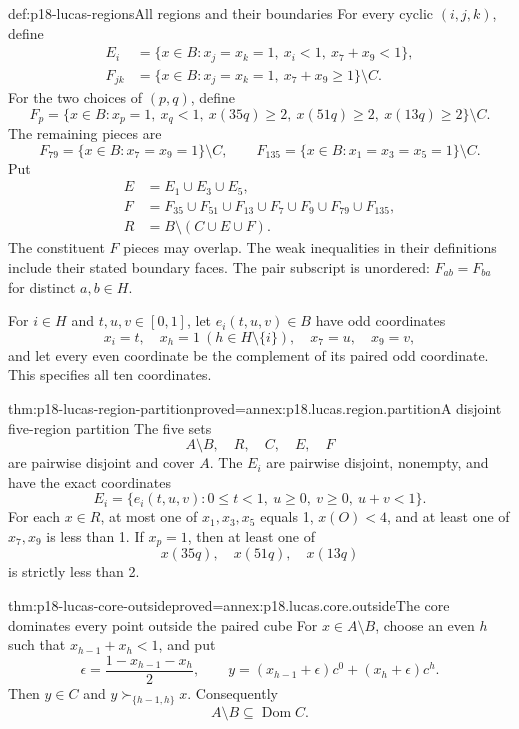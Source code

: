 \begin{hbdefinition}{def:p18-lucas-regions}{All regions and their boundaries}
For every cyclic \((i,j,k)\), define
\[
\begin{aligned}
 E_i&=\{x\in B:x_j=x_k=1,\ x_i<1,\ x_7+x_9<1\},\\
 F_{jk}&=\{x\in B:x_j=x_k=1,\ x_7+x_9\geq1\}\setminus C.
\end{aligned}
\]
For the two choices of \((p,q)\), define
\[
 F_p=\{x\in B:x_p=1,\ x_q<1,\
             x(35q)\geq2,\ x(51q)\geq2,\ x(13q)\geq2\}\setminus C.
\]
The remaining pieces are
\[
 F_{79}=\{x\in B:x_7=x_9=1\}\setminus C,\qquad
 F_{135}=\{x\in B:x_1=x_3=x_5=1\}\setminus C.
\]
Put
\[
\begin{aligned}
 E&=E_1\cup E_3\cup E_5,\\
 F&=F_{35}\cup F_{51}\cup F_{13}\cup F_7\cup F_9
                              \cup F_{79}\cup F_{135},\\
 R&=B\setminus(C\cup E\cup F).
\end{aligned}
\]
The constituent \(F\) pieces may overlap. The weak inequalities
in their definitions include their stated boundary faces.
The pair subscript is unordered: \(F_{ab}=F_{ba}\) for distinct
\(a,b\in H\).

For \(i\in H\) and \(t,u,v\in[0,1]\), let \(e_i(t,u,v)\in B\)
have odd coordinates
\[
 x_i=t,\quad x_h=1\ (h\in H\setminus\{i\}),\quad x_7=u,\quad x_9=v,
\]
and let every even coordinate be the complement of its paired
odd coordinate. This specifies all ten coordinates.
\end{hbdefinition}

\begin{hblemma}{thm:p18-lucas-region-partition}{proved=annex:p18.lucas.region.partition}{A disjoint five-region partition}
The five sets
\[
                 A\setminus B,\quad R,\quad C,\quad E,\quad F
\]
are pairwise disjoint and cover \(A\). The \(E_i\) are pairwise
disjoint, nonempty, and have the exact coordinates
\[
 E_i=\{e_i(t,u,v):0\leq t<1,\ u\geq0,\ v\geq0,\ u+v<1\}.
\]
For each \(x\in R\), at most one of \(x_1,x_3,x_5\) equals 1,
\(x(O)<4\), and at least one of \(x_7,x_9\) is less than 1.
If \(x_p=1\), then at least one of
\[
                        x(35q),\quad x(51q),\quad x(13q)
\]
is strictly less than 2.
\end{hblemma}

\begin{hblemma}{thm:p18-lucas-core-outside}{proved=annex:p18.lucas.core.outside}{The core dominates every point outside the paired cube}
For \(x\in A\setminus B\), choose an even \(h\) such that
\(x_{h-1}+x_h<1\), and put
\[
 \epsilon=\frac{1-x_{h-1}-x_h}{2},\qquad
 y=(x_{h-1}+\epsilon)c^0+(x_h+\epsilon)c^h.
\]
Then \(y\in C\) and \(y\succ_{\{h-1,h\}}x\). Consequently
\[
                         A\setminus B\subseteq\operatorname{Dom}C.
\]
\end{hblemma}

